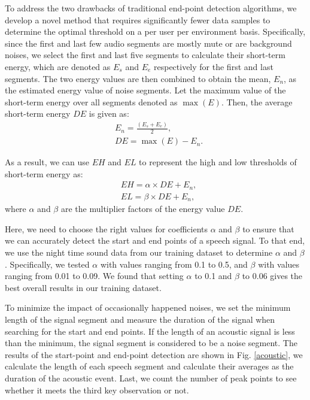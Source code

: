 To address the two drawbacks of traditional end-point detection algorithms, we develop a novel method that requires significantly fewer
data samples to determine the optimal threshold on a per user per environment basis.
%
%
Specifically, since the first and last few audio segments are mostly mute or are background noises, we select the first and last five
segments to calculate their short-term energy, which are denoted as $E_s$ and $E_e$ respectively for the first and last segments. The two
energy values are then combined to obtain the mean, $E_n$, as the estimated energy value of noise segments. Let the maximum value of the
short-term energy over all segments denoted as $\max (E)$. Then, the average short-term energy $DE$ is given as:
\begin{eqnarray}
      &E_n = \frac{(E_s+E_e)}{2}, \\
      &DE = \max (E)-E_n.\label{eq:DE}
\end{eqnarray}

As a result, we can use $EH$ and $EL$ to represent the high and low thresholds of short-term energy as:
\begin{eqnarray}
      &EH=\alpha \times DE+E_n,\\
      &EL=\beta \times DE+E_n,
\end{eqnarray}
where $\alpha$ and $\beta$ are the multiplier factors of the energy value $DE$.


Here, we need to choose the right values for coefficients $\alpha$ and $\beta$ to ensure that we can accurately detect the start and end
points of a speech signal. To that end, we use the night time sound data from our training dataset to determine $\alpha$ and $\beta$.
Specifically, we tested $\alpha$ with values ranging from 0.1 to 0.5, and $\beta$ with values ranging from 0.01 to 0.09. We found that
setting $\alpha$ to  0.1 and $\beta$ to  0.06 gives the best overall results in our training dataset.

To minimize the impact of occasionally happened noises, we set the minimum length of the signal segment and measure the duration of the
signal when searching for the start and end points. If the length of an acoustic signal is less than the minimum, the signal segment is
considered to be a noise segment. The results of the start-point and end-point detection are shown in Fig. \ref{acoustic}, we calculate the
length of each speech segment and calculate their averages as the duration of the acoustic event. Last, we count the number of peak points
to see whether it meets the third key observation or not.



